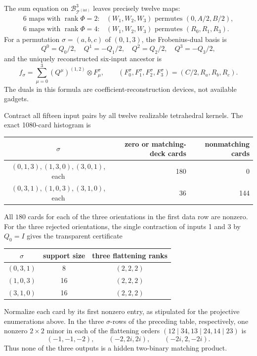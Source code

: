 \documentclass[11pt,letterpaper,onecolumn]{article}
\theoremstyle{plain}
\theoremstyle{definition}
\theoremstyle{remark}
\newcommand{\TetInt}{{\mathcal T^{(\mathrm{int})}}}
\newcommand{\rank}{\operatorname{rank}}
\begin{document}
The sum equation on \(\mathcal B_{\TetInt}^3\) leaves precisely twelve maps:
\begin{equation}
 \begin{array}{ll}
 6\text{ maps with }\rank\Phi=2:&
 (W_1,W_2,W_3)\text{ permutes }(0,A/2,B/2),\\[1mm]
 6\text{ maps with }\rank\Phi=4:&
 (W_1,W_2,W_3)\text{ permutes }(R_0,R_1,R_3).
 \end{array}
 \label{eq:cert-A4-twelve-maps}
\end{equation}
For a permutation \(\sigma=(a,b,c)\) of \((0,1,3)\), the Frobenius-dual
basis is
\[
 Q^0=Q_0/2,\quad Q^1=-Q_1/2,\quad
 Q^2=Q_2/2,\quad Q^3=-Q_3/2,
\]
and the uniquely reconstructed six-input ancestor is
\begin{equation*}
 f_\sigma=\sum_{\mu=0}^3(Q^\mu)^{(1,2)}\otimes F^\sigma_\mu,
 \qquad
 (F_0^\sigma,F_1^\sigma,F_2^\sigma,F_3^\sigma)
 =(C/2,R_a,R_b,R_c).
\end{equation*}
The duals in this formula are coefficient-reconstruction devices, not
available gadgets.

Contract all fifteen input pairs by all twelve realizable tetrahedral
kernels.  The exact 1080-card histogram is
\begin{center}
\normalsize
\begin{tabular}{c@{\qquad}rr}
\toprule
\(\sigma\)&zero or matching-deck cards&nonmatching cards\\
\midrule
\((0,1,3),(1,3,0),(3,0,1)\), each&180&0\\
\((0,3,1),(1,0,3),(3,1,0)\), each&36&144\\
\bottomrule
\end{tabular}
\end{center}
All \(180\) cards for each of the three orientations in the first data row
are nonzero.
For the three rejected orientations, the single contraction of inputs
1 and 3 by \(Q_0=I\) gives the transparent certificate
\begin{center}
\normalsize
\begin{tabular}{c@{\qquad}c@{\qquad}c}
\toprule
\(\sigma\)&support size&three flattening ranks\\
\midrule
\((0,3,1)\)&8&\((2,2,2)\)\\
\((1,0,3)\)&16&\((2,2,2)\)\\
\((3,1,0)\)&16&\((2,2,2)\)\\
\bottomrule
\end{tabular}
\end{center}
Normalize each card by its first nonzero entry, as stipulated for the
projective enumerations above.  In the three \(\sigma\)-rows of the
preceding table, respectively, one nonzero \(2\times2\) minor in each of the flattening orders
\((12\mid34,13\mid24,14\mid23)\) is
\[
 (-1,-1,-2),\qquad(-2,2i,2i),\qquad(-2i,2,-2i).
\]
Thus none of the three outputs is a hidden two-binary matching product.
\end{document}
